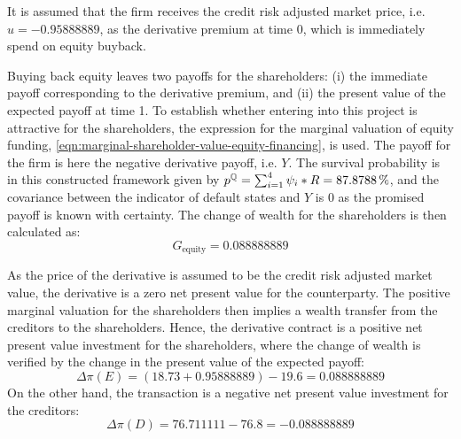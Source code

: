\documentclass[../main.tex]{subfiles}
\begin{document}
            It is assumed that the firm receives the credit risk adjusted market price,
            i.e. $u=\num{-0.95888889}$, as the derivative premium at time 0, which is immediately spend on equity buyback.

            Buying back equity leaves two payoffs for the shareholders:
            (i) the immediate payoff corresponding to the derivative premium, and
            (ii) the present value of the expected payoff at time 1.
            To establish whether entering into this project is attractive for the shareholders,
            the expression for the marginal valuation of equity funding, \cref{eqn:marginal-shareholder-value-equity-financing}, is used.
            The payoff for the firm is here the negative derivative payoff, i.e. $Y$.
            The survival probability is in this constructed framework given by $p^{\rnmeasure} = \sum_{i=1}^{4} \psi_{i} * \grossrfrate = \pct{0.878788}$, and the covariance between the indicator of default states and $Y$ is 0 as the promised payoff is known with certainty.
            The change of wealth for the shareholders is then calculated as:
            \begin{equation}
                G_{\text{equity}} = \num{0.088888889}
            \end{equation}
            
            As the price of the derivative is assumed to be the credit risk adjusted market value,
            the derivative is a zero net present value for the counterparty.
            The positive marginal valuation for the shareholders then implies a wealth transfer from the creditors to the shareholders.
            Hence, the derivative contract is a positive net present value investment for the shareholders, 
            where the change of wealth is verified by the change in the present value of the expected payoff:
            \begin{equation}
                \Delta \pi(E) = (\num{18.73} + \num{0.95888889}) - \num{19.6} = \num{0.088888889}
            \end{equation}
            On the other hand, the transaction is a negative net present value investment for the creditors:
            \begin{equation}
                \Delta \pi(D) = \num{76.711111} - \num{76.8} = \num{-0.088888889}
            \end{equation}
\end{document}
